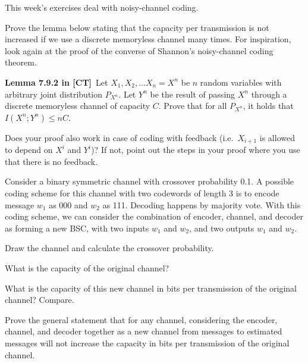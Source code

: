 \documentclass[a4paper,10pt,landscape,twocolumn]{scrartcl}
\begin{document}
\practiceproblems

{\sffamily\noindent
This week's exercises deal with noisy-channel coding. \practiceinstructions
}


\begin{exercise}
Prove the lemma below stating that the capacity per transmission is not increased if we use a discrete memoryless channel many times. For inspiration, look again at the proof of the converse of Shannon's noisy-channel coding theorem.

\medskip
\noindent\textbf{Lemma 7.9.2 in [CT]}\  Let $X_1, X_2, \ldots X_n = X^n$ be $n$ random variables with arbitrary joint distribution $P_{X^n}$. Let $Y^n$ be the result of passing $X^n$ through a discrete memoryless channel of capacity $C$. Prove that for all $P_{X^n}$, it holds that $I(X^n; Y^n) \leq nC$.
\medskip

Does your proof also work in case of coding with feedback (i.e.\ $X_{i+1}$ is allowed to depend on $X^i$ and $Y^i$)? If not, point out the steps in your proof where you use that there is no feedback.
\end{exercise}




\begin{exercise}
Consider a binary symmetric channel with crossover probability 0.1. A possible coding scheme for this channel with two codewords of length 3 is to encode message $w_1$ as 000 and $w_2$ as 111. Decoding happens by majority vote. With this coding scheme, we can consider the combination of encoder, channel, and decoder as forming a new BSC, with two inputs $w_1$ and $w_2$, and two outputs $w_1$ and $w_2$.

\begin{subex}
Draw the channel and calculate the crossover probability.
\end{subex}

\begin{subex}
What is the capacity of the original channel?
\end{subex}

\begin{subex}
What is the capacity of this new channel in bits per transmission of the original channel? Compare.
\end{subex}

\begin{subex}
Prove the general statement that for any channel, considering the encoder, channel, and decoder together as a new channel from messages to estimated messages will not increase the capacity in bits per transmission of the original channel.
\end{subex}

\end{exercise}
\end{document}
